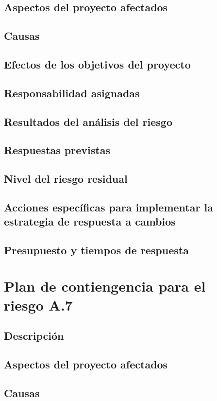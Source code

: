 \documentclass[11pt,a4paper,spanish,twoside]{report}
\begin{document}
\subsection{Aspectos del proyecto afectados}
\subsection{Causas}
\subsection{Efectos de los objetivos del proyecto}
\subsection{Responsabilidad asignadas}
\subsection{Resultados del análisis del riesgo}
\subsection{Respuestas previstas}
\subsection{Nivel del riesgo residual}
\subsection{Acciones específicas para implementar la estrategia de respuesta
a cambios}
\subsection{Presupuesto y tiempos de respuesta}

\section{Plan de contiengencia para el riesgo A.7}
\subsection{Descripción}
\subsection{Aspectos del proyecto afectados}
\subsection{Causas}
\end{document}
